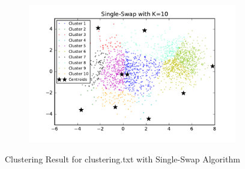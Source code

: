 \begin{figure}[htb]
\begin{subfigure}[b]{0.475\textwidth}
        \end{subfigure}
        \hfill
        \begin{subfigure}[b]{0.475\textwidth}   
            \centering 
            \includegraphics[width=\textwidth]{./figures/clustering_singleSwap_10.pdf}
        \end{subfigure}
        
        \caption{Clustering Result for clustering.txt with Single-Swap Algorithm}
        \label{fig:kmean_clustering}
\end{figure}

